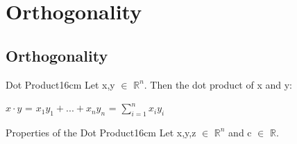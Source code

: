 \newpage

\section[Day 3: Orthogonality]{ Orthogonality }

\subsection{ Orthogonality }

    \begin{definition}{Dot Product}{16cm}
        Let x,y $\in$ $\mathbb{R}^n$. Then the {\color{lblue} dot product}
        of x and y:

        \hspace{0.5cm}
        $x \cdot y$ = $x_1y_1 + ... + x_ny_n$ = $\sum_{i=1}^n x_iy_i$
    \end{definition}

    \vspace{0.5cm}



    \begin{wtheorem}{Properties of the Dot Product}{16cm}
        Let x,y,z $\in$ $\mathbb{R}^n$ and c $\in$ $\mathbb{R}$.
    \end{wtheorem}

